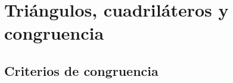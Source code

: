 \thispagestyle{plain}
\section{Tri\'angulos, cuadril\'ateros y congruencia}
\subsection{Criterios de congruencia}

\newpage